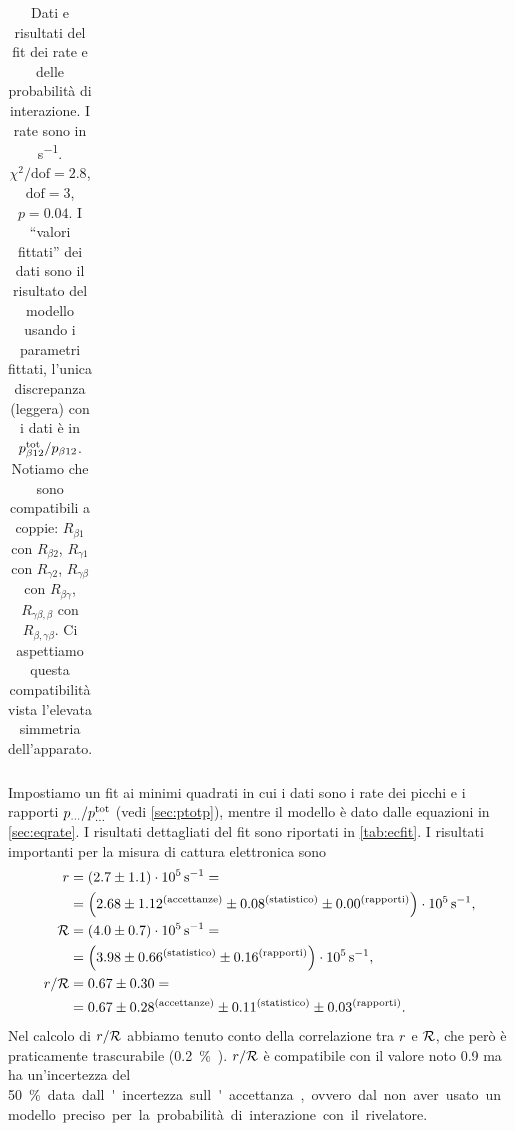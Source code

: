 \begin{table}
\begin{tabular}{ccc|cc}
	\end{tabular}
	\caption{\label{tab:ecfit}
	Dati e risultati del fit dei rate e delle probabilità di interazione.
	I rate sono in \si{s^{-1}}.
	$\chi^2/\text{dof} = 2.8$, $\text{dof}=3$, $p=0.04$.
	I ``valori fittati'' dei dati sono il risultato del modello usando i parametri fittati,
	l'unica discrepanza (leggera) con i dati è in $p_{\beta12}\tot/p_{\beta12}$.
	Notiamo che sono compatibili a coppie:
	$R_{\beta1}$ con $R_{\beta2}$,
	$R_{\gamma1}$ con $R_{\gamma2}$,
	$R_{\gamma\beta}$ con $R_{\beta\gamma}$,
	$R_{\gamma\beta,\beta}$ con $R_{\beta,\gamma\beta}$.
	Ci aspettiamo questa compatibilità vista l'elevata simmetria dell'apparato.} 
\end{table}

Impostiamo un fit ai minimi quadrati
in cui i dati sono i rate dei picchi e i rapporti $p_{\dots}/p_{\dots}\tot$ (vedi \autoref{sec:ptotp}),
mentre il modello è dato dalle equazioni in \autoref{sec:eqrate}.
I risultati dettagliati del fit sono riportati in \autoref{tab:ecfit}.
I risultati importanti per la misura di cattura elettronica sono
\begin{align*}
	\R
	&= (2.7 \pm 1.1) \cdot 10^5 \,\si{s^{-1}} = \\
	&= \left(2.68
	\pm 1.12^\text{(accettanze)}
	\pm 0.08^\text{(statistico)}
	\pm 0.00^\text{(rapporti)}\right) \cdot 10^5 \,\si{s^{-1}}, \\
	\Rtot
	&= (4.0 \pm 0.7) \cdot 10^5 \,\si{s^{-1}} = \\
	&= \left(3.98
	\pm 0.66^\text{(statistico)}
	\pm 0.16^\text{(rapporti)}\right) \cdot 10^5 \,\si{s^{-1}}, \\
	\R/\Rtot
	&= 0.67 \pm 0.30 = \\
	&= 0.67 \pm 0.28^\text{(accettanze)} \pm 0.11^\text{(statistico)} \pm 0.03^\text{(rapporti)}.
\end{align*}
Nel calcolo di $\R/\Rtot$ abbiamo tenuto conto della correlazione tra $\R$ e $\Rtot$,
che però è praticamente trascurabile (\SI{0.2}\%).
$\R/\Rtot$ è compatibile con il valore noto 0.9
ma ha un'incertezza del \SI{50}\% data dall'incertezza sull'accettanza,
ovvero dal non aver usato un modello preciso per la probabilità di interazione con il rivelatore.

